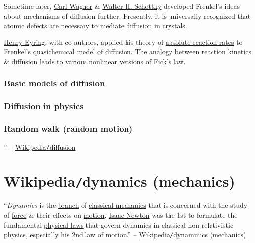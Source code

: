 \documentclass{article}
\begin{document}
Sometime later, \href{https://en.wikipedia.org/wiki/Carl_Wagner}{\sc Carl Wagner} \& \href{https://en.wikipedia.org/wiki/Walter_H._Schottky}{\sc Walter H. Schottky} developed Frenkel's ideas about mechanisms of diffusion further. Presently, it is universally recognized that atomic defects are necessary to mediate diffusion in crystals.

\href{https://en.wikipedia.org/wiki/Henry_Eyring_(chemist)}{\sc Henry Eyring}, with co-authors, applied his theory of \href{https://en.wikipedia.org/wiki/Transition_state_theory}{absolute reaction rates} to Frenkel's quasichemical model of diffusion. The analogy between \href{https://en.wikipedia.org/wiki/Chemical_kinetics}{reaction kinetics} \& diffusion leads to various nonlinear versions of Fick's law.

\subsubsection{Basic models of diffusion}

\subsubsection{Diffusion in physics}

\subsubsection{Random walk (random motion)}

'' -- \href{https://en.wikipedia.org/wiki/Diffusion}{Wikipedia{\tt/}diffusion}


\section{Wikipedia{\tt/}dynamics (mechanics)}
``\textit{Dynamics} is the \href{https://en.wikipedia.org/wiki/Branch_(academia)#Physics}{branch} of \href{https://en.wikipedia.org/wiki/Classical_mechanics}{classical mechanics} that is concerned with the study of \href{https://en.wikipedia.org/wiki/Force_(physics)}{force} \& their effects on \href{https://en.wikipedia.org/wiki/Motion_(physics)}{motion}. \href{https://en.wikipedia.org/wiki/Isaac_Newton}{Isaac Newton} was the 1st to formulate the fundamental \href{https://en.wikipedia.org/wiki/Physical_law}{physical laws} that govern dynamics in classical non-relativistic physics, especially his \href{https://en.wikipedia.org/wiki/Second_law_of_motion}{2nd law of motion}.'' -- \href{https://en.wikipedia.org/wiki/Dynamics_(mechanics)}{Wikipedia\texttt{/}dynammics (mechanics)}
\end{document}
